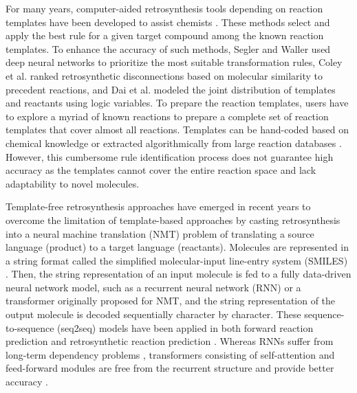 \documentclass[journal=jacsat,manuscript=article]{achemso}
\begin{document}
	For many years, computer-aided retrosynthesis tools depending on reaction templates have been developed to assist chemists \cite{satoh1995sophia,ihlenfeldt1996computer,todd2005computer,kowalik2012parallel,christ2012mining,cook2012computer,bogevig2015route,szymkuc2016computer}. These methods select and apply the best rule for a given target compound among the known reaction templates. To enhance the accuracy of such methods, Segler and Waller \cite{segler2017neural} used deep neural networks to prioritize the most suitable transformation rules, Coley et al. \cite{coley2017computer} ranked retrosynthetic disconnections based on molecular similarity to precedent reactions, and Dai et al. \cite{dai2019retrosynthesis} modeled the joint distribution of templates and reactants using logic variables. To prepare the reaction templates, users have to explore a myriad of known reactions to prepare a complete set of reaction templates that cover almost all reactions. Templates can be hand-coded based on chemical knowledge \cite{hartenfeller2011collection,szymkuc2016computer} or extracted algorithmically from large reaction databases \cite{law2009route,coley2017prediction}. However, this cumbersome rule identification process does not guarantee high accuracy as the templates cannot cover the entire reaction space and lack adaptability to novel molecules.
	
	Template-free retrosynthesis approaches have emerged in recent years to overcome the limitation of template-based approaches by casting retrosynthesis into a neural machine translation (NMT) problem of translating a source language (product) to a target language (reactants). Molecules are represented in a string format called the simplified molecular-input line-entry system (SMILES) \cite{weininger1988smiles}. Then, the string representation of an input molecule is fed to a fully data-driven neural network model, such as a recurrent neural network (RNN) \cite{nam2016linking, liu2017retrosynthetic} or a transformer \cite{schwaller2019molecular, zheng2019predicting, chen2019learning, karpov2019transformer} originally proposed for NMT, and the string representation of the output molecule is decoded sequentially character by character. These sequence-to-sequence (seq2seq) models have been applied in both forward reaction prediction \cite{nam2016linking, schwaller2019molecular} and retrosynthetic reaction prediction \cite{liu2017retrosynthetic, zheng2019predicting, chen2019learning, karpov2019transformer}.  Whereas RNNs suffer from long-term dependency problems \cite{nam2016linking, liu2017retrosynthetic}, transformers consisting of self-attention and feed-forward modules are free from the recurrent structure and provide better accuracy \cite{schwaller2019molecular, karpov2019transformer, chen2019learning, zheng2019predicting}.
	
\end{document}
